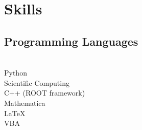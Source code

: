

\section{Skills}
\subsection{Programming Languages}\\

\textbullet{} Python \\
\textbullet{} Scientific Computing \\
\textbullet{} C++ (ROOT framework) \\
\textbullet{} Mathematica\\
\textbullet{} LaTeX \\
\textbullet{} VBA \\ 
\sectionsep
